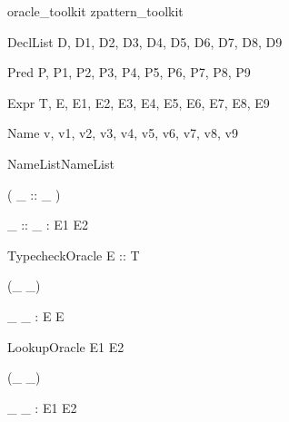 \documentclass{article}
\begin{document}
\begin{zsection}
  \SECTION oracle\_toolkit \parents zpattern\_toolkit
\end{zsection}

\begin{zedjoker}{DeclList} D, D1, D2, D3, D4, D5, D6, D7, D8, D9 \end{zedjoker}
\begin{zedjoker}{Pred} P, P1, P2, P3, P4, P5, P6, P7, P8, P9 \end{zedjoker}
\begin{zedjoker}{Expr} T, E, E1, E2, E3, E4, E5, E6, E7, E8, E9 \end{zedjoker}
\begin{zedjoker}{Name} v, v1, v2, v3, v4, v5, v6, v7, v8, v9 \end{zedjoker}
\begin{zedjoker}{NameList}NameList\end{zedjoker}

\begin{zed}
  \relation ( \_ :: \_ )
\end{zed}

\begin{gendef}[E1,E2]
  \_ :: \_ : E1 \rel E2
\end{gendef}

\begin{zedoracle}{TypecheckOracle}
  E :: T
\end{zedoracle}




\begin{zed}
  \relation (\_ \hasDefn \_)
\end{zed}

\begin{gendef}[E]
  \_ \hasDefn \_ : E \rel E
\end{gendef}

\begin{zedoracle}{LookupOracle}
  E1 \hasDefn E2
\end{zedoracle}




\begin{zed}
  \relation (\_ \is \_)
\end{zed}

\begin{gendef}[E1,E2]
  \_ \is \_ : E1 \rel E2
\end{gendef}
\end{document}
